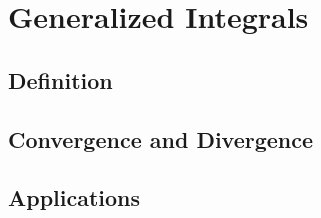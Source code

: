 \chapter{Generalized Integrals}\label{int}
\section{Definition}\label{int:def}
\section{Convergence and Divergence}\label{int:comp}
\section{Applications}\label{int:app}
